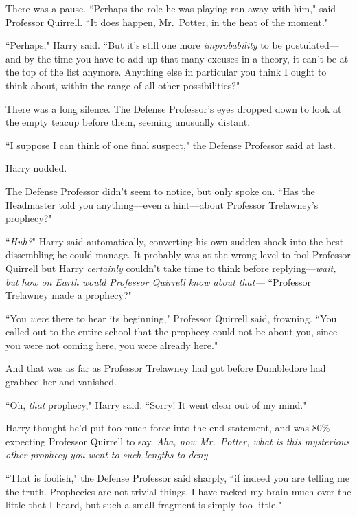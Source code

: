 There was a pause. ``Perhaps the role he was playing ran away with him," said Professor Quirrell. ``It does happen, Mr.~Potter, in the heat of the moment."

``Perhaps," Harry said. ``But it's still one more \emph{improbability} to be postulated—and by the time you have to add up that many excuses in a theory, it can't be at the top of the list anymore. Anything else in particular you think I ought to think about, within the range of all other possibilities?"

There was a long silence. The Defense Professor's eyes dropped down to look at the empty teacup before them, seeming unusually distant.

``I suppose I can think of one final suspect," the Defense Professor said at last.

Harry nodded.

The Defense Professor didn't seem to notice, but only spoke on. ``Has the Headmaster told you anything—even a hint—about Professor Trelawney's prophecy?"

``\emph{Huh?}" Harry said automatically, converting his own sudden shock into the best dissembling he could manage. It probably was at the wrong level to fool Professor Quirrell but Harry \emph{certainly} couldn't take time to think before replying—\emph{wait, but how on Earth would Professor Quirrell know about \emph{that}—} ``Professor Trelawney made a prophecy?"

``You \emph{were} there to hear its beginning," Professor Quirrell said, frowning. ``You called out to the entire school that the prophecy could not be about you, since you were not coming here, you were already here."


And that was as far as Professor Trelawney had got before Dumbledore had grabbed her and vanished.

``Oh, \emph{that} prophecy," Harry said. ``Sorry! It went clear out of my mind."

Harry thought he'd put too much force into the end statement, and was 80\%-expecting Professor Quirrell to say, \emph{Aha, now Mr.~Potter, what is this mysterious \emph{other} prophecy you went to such lengths to deny—}

``That is foolish," the Defense Professor said sharply, ``if indeed you are telling me the truth. Prophecies are not trivial things. I have racked my brain much over the little that I heard, but such a small fragment is simply too little."

